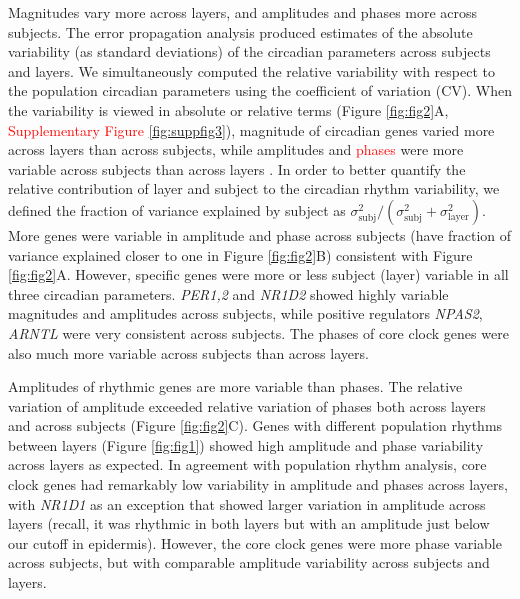 Magnitudes vary more across layers, and amplitudes and phases more across subjects. The error propagation analysis produced estimates of the absolute variability (as standard deviations) of the circadian parameters across subjects and layers. We simultaneously computed the relative variability with respect to the population circadian parameters using the coefficient of variation (CV). When the variability is viewed in absolute or relative terms (Figure \ref{fig:fig2}A, \textcolor{red}{Supplementary Figure \ref{fig:suppfig3}}), magnitude of circadian genes varied more across layers than across subjects, while amplitudes and \textcolor{red}{phases} were more variable across subjects than across layers . In order to better quantify the relative contribution of layer and subject to the circadian rhythm variability, we defined the fraction of variance explained by subject as $\sigma^2_\textrm{subj}/(\sigma^2_\textrm{subj} + \sigma^2_\textrm{layer})$. More genes were variable in amplitude and phase across subjects (have fraction of variance explained closer to one in Figure \ref{fig:fig2}B) consistent with Figure \ref{fig:fig2}A. However, specific genes were more or less subject (layer) variable in all three circadian parameters. \textit{PER1,2} and \textit{NR1D2} showed highly variable magnitudes and amplitudes across subjects, while positive regulators \textit{NPAS2}, \textit{ARNTL} were very consistent across subjects. The phases of core clock genes were also much more variable across subjects than across layers.

Amplitudes of rhythmic genes are more variable than phases. The relative variation of amplitude exceeded relative variation of phases both across layers and across subjects (Figure \ref{fig:fig2}C). Genes with different population rhythms between layers (Figure \ref{fig:fig1}) showed high amplitude and phase variability across layers as expected. In agreement with population rhythm analysis, core clock genes had remarkably low variability in amplitude and phases across layers, with \textit{NR1D1} as an exception that showed larger variation in amplitude across layers (recall, it was rhythmic in both layers but with an amplitude just below our cutoff in epidermis). However, the core clock genes were more phase variable across subjects, but with comparable amplitude variability across subjects and layers. 

